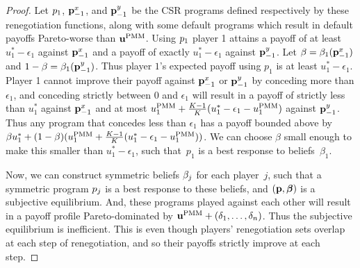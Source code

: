 \documentclass[sigconf]{aamas}
\newcommand{\epsdeltaone}{\epsilon_1}
\newcommand{\bestparetopayoffone}{u^*_1}
\newcommand{\selection}{sel}%
\newcommand{\renegb}{\mathbf{\selection}}
\theoremstyle{definition}
\begin{document}
\begin{proof}
%
Let $p_1$, $\textbf{p}_{-1}^x$, and $\textbf{p}_{-1}^y$  
be the 
CSR
programs defined respectively by these renegotiation functions,
along with some default programs which result 
in default payoffs Pareto-worse than
$\textbf{u}^{\textnormal{PMM}}$.
Using $p_1$ player 1 attains a payoff of 
at least $\bestparetopayoffone-\epsdeltaone$ against $\textbf{p}_{-1}^x$ 
and a payoff of exactly $u^*_1-\epsdeltaone$ against 
$\textbf{p}_{-1}^y$. Let $\beta=\beta_{1}(\textbf{p}_{-1}^x)$ and 
$1-\beta=\beta_{1}(\textbf{p}_{-1}^y)$. Thus player $1$'s 
expected payoff using $p_1$ is at least
$\bestparetopayoffone-\epsdeltaone$. Player 1 cannot 
improve their payoff against $\textbf{p}_{-1}^x$ or $\textbf{p}_{-1}^y$ by 
conceding more than $\epsdeltaone$, and conceding
strictly between $0$ and $\epsdeltaone$ will result in a payoff
of strictly less than $\bestparetopayoffone$ against
$\textbf{p}_{-1}^x$
and at most
$\pmmone + \frac{K-1}{K}(\bestparetopayoffone-\epsdeltaone
-\pmmone)$ against $\textbf{p}_{-1}^y$. Thus any program that concedes less than 
$\epsdeltaone$ has a payoff bounded above by 
$\beta\bestparetopayoffone + (1-\beta)(\pmmone + \frac{K-1}{K}(\bestparetopayoffone-\epsdeltaone
-\pmmone))$. We can choose $\beta$ small enough to make this smaller than 
$\bestparetopayoffone-\epsdeltaone$, such that~$p_1$ is a best response to beliefs~$\beta_{1}$. 
\par Now, we can construct
symmetric beliefs $\beta_j$ for  each
player~$j$, such that a symmetric program $p_j$
is a best response to these beliefs, and $(\textbf{p}, \boldsymbol{\beta})$
is a subjective equilibrium. And, these programs
played against each other will result in a 
payoff profile Pareto-dominated by 
$\textbf{u}^{\textnormal{PMM}} + (\delta_1, \dots, \delta_n)$.
Thus the subjective equilibrium is 
inefficient. This is even though 
players' renegotiation sets 
overlap at each step of renegotiation, and
so their payoffs strictly improve 
at each step.



\end{proof}
\end{document}
